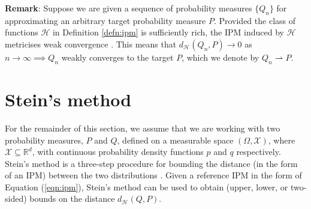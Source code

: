 \textbf{Remark}: Suppose we are given a sequence of probability measures $\{Q_n\}$ for approximating an arbitrary target probability measure $P$. Provided the class of functions $\mathcal{H}$ in Definition \ref{defn:ipm} is sufficiently rich, the IPM induced by $\mathcal{H}$ metricises weak convergence \citep{gorham_sample_quality_2015}. This means that $d_{\mathcal{H}}(Q_n, P) \rightarrow 0$ as $n \rightarrow \infty \implies Q_n$ weakly converges to the target $P$, which we denote by $Q_n \rightharpoonup P$.


\section{Stein's method}
\label{section:2_steins_method}

For the remainder of this section, we assume that we are working with two probability measures, $P$ and $Q$, defined on a measurable space $(\Omega, \mathcal{X})$, where $\mathcal{X} \subseteq \mathbb{R}^d$, with continuous probability density functions $p$ and $q$ respectively. Stein's method is a three-step procedure for bounding the distance (in the form of an IPM) between the two distributions \citep{gorham_sample_quality}. Given a reference IPM in the form of Equation (\ref{eqn:ipm}), Stein's method can be used to obtain (upper, lower, or two-sided) bounds on the distance $d_{\mathcal{H}}(Q, P)$.



